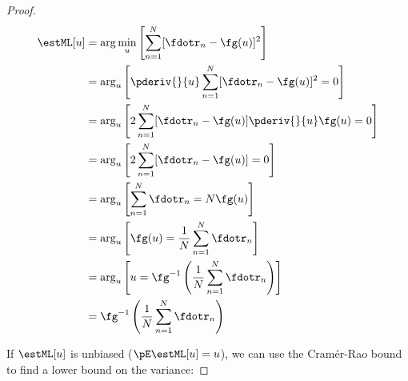 \begin{proof}
\begin{align*}
   \estML[u]
     &= \arg\min_u
         \left[ \sum_{n=1}^N [\fdotr_n-\fg( u )]^2 \right]
   \\&= \arg_u\left[
            \pderiv{}{ u }\sum_{n=1}^N [\fdotr_n-\fg( u )]^2 = 0
         \right]
   \\&= \arg_u\left[
             2\sum_{n=1}^N [\fdotr_n-\fg( u )]\pderiv{}{ u }\fg( u ) = 0
         \right]
   \\&= \arg_u\left[
             2\sum_{n=1}^N [\fdotr_n-\fg( u )] = 0
         \right]
   \\&= \arg_u\left[
             \sum_{n=1}^N \fdotr_n = N \fg( u )
         \right]
   \\&= \arg_u\left[
             \fg( u ) = \frac{1}{N}\sum_{n=1}^N \fdotr_n
         \right]
   \\&= \arg_u\left[
              u  = \fg^{-1}\left(\frac{1}{N}\sum_{n=1}^N \fdotr_n\right)
         \right]
   \\&= \fg^{-1}\left(\frac{1}{N}\sum_{n=1}^N \fdotr_n\right)
\end{align*}


If $\estML[u]$ is unbiased ($\pE\estML[u]= u $), we can use
the Cram\'er-Rao bound to find a lower bound on the variance:


\end{proof}
